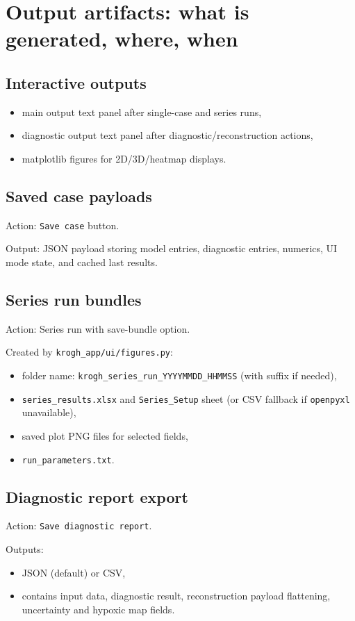 \documentclass[12pt,a4paper]{article}
\begin{document}
\section{Output artifacts: what is generated, where, when}
\subsection{Interactive outputs}
\begin{itemize}
    \item main output text panel after single-case and series runs,
    \item diagnostic output text panel after diagnostic/reconstruction actions,
    \item matplotlib figures for 2D/3D/heatmap displays.
\end{itemize}

\subsection{Saved case payloads}
Action: \texttt{Save case} button.

Output: JSON payload storing model entries, diagnostic entries, numerics, UI mode state, and cached last results.

\subsection{Series run bundles}
Action: Series run with save-bundle option.

Created by \texttt{krogh\_app/ui/figures.py}:
\begin{itemize}
    \item folder name: \texttt{krogh\_series\_run\_YYYYMMDD\_HHMMSS} (with suffix if needed),
    \item \texttt{series\_results.xlsx} and \texttt{Series\_Setup} sheet (or CSV fallback if \texttt{openpyxl} unavailable),
    \item saved plot PNG files for selected fields,
    \item \texttt{run\_parameters.txt}.
\end{itemize}

\subsection{Diagnostic report export}
Action: \texttt{Save diagnostic report}.

Outputs:
\begin{itemize}
    \item JSON (default) or CSV,
    \item contains input data, diagnostic result, reconstruction payload flattening, uncertainty and hypoxic map fields.
\end{itemize}
\end{document}
